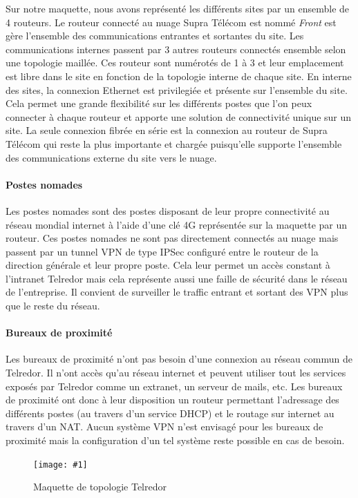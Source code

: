 \documentclass{article}
\newenvironment{figue}[1]{
	\par
	\bigskip
	\begin{figure}[h]
	\begin{center}
	  \texttt{[image: \#1]}
	\end{center}
}{
	\end{figure}
	\bigskip
}
\newcommand{\tlr}{Telredor\xspace}
\newcommand{\spr}{Supra Télécom\xspace}
\begin{document}
Sur notre maquette, nous avons représenté les différents sites par un ensemble de 4 routeurs.
Le routeur connecté au nuage \spr est nommé \emph{Front} est gère l'ensemble des communications entrantes et sortantes du site.
Les communications internes passent par 3 autres routeurs connectés ensemble selon une topologie maillée.
Ces routeur sont numérotés de 1 à 3 et leur emplacement est libre dans le site en fonction de la topologie interne de chaque site.
En interne des sites, la connexion Ethernet est privilegiée et présente sur l'ensemble du site.
Cela permet une grande flexibilité sur les différents postes que l'on peux connecter à chaque routeur et apporte une solution de connectivité unique sur un site.
La seule connexion fibrée en série est la connexion au routeur de \spr qui reste la plus importante et chargée puisqu'elle supporte l'ensemble des communications externe du site vers le nuage.

\paragraph{Postes nomades} Les postes nomades sont des postes disposant de leur propre connectivité au réseau mondial internet à l'aide d'une clé 4G représentée sur la maquette par un routeur.
Ces postes nomades ne sont pas directement connectés au nuage mais passent par un tunnel VPN de type IPSec configuré entre le routeur de la direction générale et leur propre poste.
Cela leur permet un accès constant à l'intranet \tlr mais cela représente aussi une faille de sécurité dans le réseau de l'entreprise.
Il convient de surveiller le traffic entrant et sortant des VPN plus que le reste du réseau.

\paragraph{Bureaux de proximité} Les bureaux de proximité n'ont pas besoin d'une connexion au réseau commun de \tlr.
Il n'ont accès qu'au réseau internet et peuvent utiliser tout les services exposés par \tlr comme un extranet, un serveur de mails, etc.
Les bureaux de proximité ont donc à leur disposition un routeur permettant l'adressage des différents postes (au travers d'un service DHCP) et le routage sur internet au travers d'un NAT.
Aucun système VPN n'est envisagé pour les bureaux de proximité mais la configuration d'un tel système reste possible en cas de besoin.

\clearpage

\begin{figue}{img/telredor.pdf}
	\caption{Maquette de topologie \tlr}
\end{figue}
\end{document}
